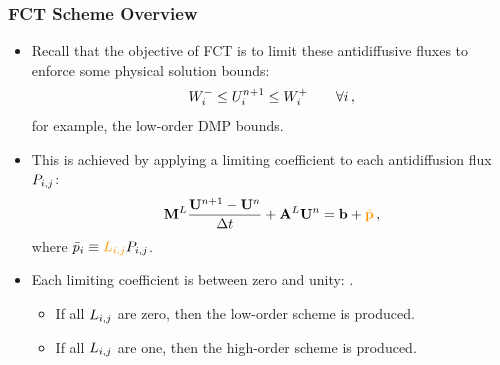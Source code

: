\begin{frame}
\frametitle{FCT Scheme Overview}

\begin{itemize}
   \item Recall that the objective of FCT is to limit these antidiffusive
      fluxes to enforce some physical solution bounds:
      \begin{equation}
         W_i^-\leq
         U_i^{n+1}\leq
         W_i^+\qquad\forall i \,,
      \end{equation}
      for example, the low-order DMP bounds.
   \item This is achieved by applying a limiting coefficient  to each
      antidiffusion flux $\correctionfluxij$:
      \begin{equation}
        \lumpedmassmatrix\frac{\solutionvector^{n+1}-\solutionvector^n}{\dt}
          + \ssmatrix^L\solutionvector^n = \ssrhs
          + \hlorange{\bar{\correctionfluxvector}} \eqc
      \end{equation}
      where $\bar{\correctionfluxletter}_i \equiv \hlorange{L\ij}\correctionfluxij$.
   \item Each limiting coefficient is between zero and unity:
     .
   \begin{itemize}
      \item If all $L_{i,j}$ are zero, then the low-order scheme is produced.
      \item If all $L_{i,j}$ are one, then the high-order scheme is produced.
   \end{itemize}
\end{itemize}

\end{frame}
